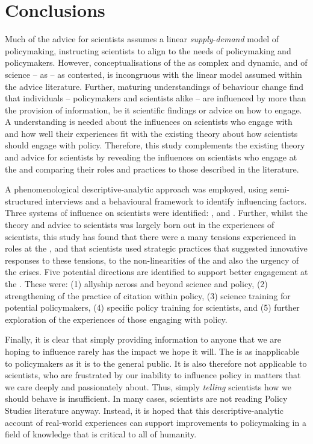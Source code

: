 \chapter{Conclusions}\label{ch:conclusions}

Much of the advice for scientists assumes a linear \emph{supply}-\emph{demand} model of policymaking, instructing scientists to align to the needs of policymaking and policymakers. However, conceptualisations of the \SPI{} as complex and dynamic, and of \CAN{} science -- as \PNS{} -- as contested, is incongruous with the linear model assumed within the advice literature. Further, maturing understandings of behaviour change find that individuals -- policymakers and scientists alike -- are influenced by more than the provision of information, be it scientific findings or advice on how to engage. A understanding is needed about the influences on scientists who engage with \CAN{} \SPI{} and how well their experiences fit with the existing theory about how scientists should engage with policy. Therefore, this study complements the existing theory and advice for scientists by revealing the influences on scientists who engage at the \CAN{} \SPI and comparing their roles and practices to those described in the literature.

A phenomenological descriptive-analytic approach was employed, using semi-structured interviews and a behavioural framework to identify influencing factors. Three systems of influence on scientists were identified: \skiinte, \skiknow{} and \skiscip. Further, whilst the theory and advice to scientists was largely born out in the experiences of scientists, this study has found that there were a many tensions experienced in roles at the \SPI, and that scientists used strategic practices that suggested innovative responses to these tensions, to the non-linearities of the \SPI{} and also the urgency of the \CAN{} crises. Five potential directions are identified to support better engagement at the \CAN{} \SPI. These were: (1) allyship across and beyond \CAN{} science and policy, (2) strengthening of the practice of citation within policy, (3) science training for potential policymakers, (4) specific policy training for scientists, and (5) further exploration of the experiences of those engaging with policy. 

Finally, it is clear that simply providing information to anyone that we are hoping to influence rarely has the impact we hope it will. The \IDM{} is as inapplicable to policymakers as it is to the general public. It is also therefore not applicable to scientists, who are frustrated by our inability to influence policy in matters that we care deeply and passionately about. Thus, simply \emph{telling} scientists how we should behave is insufficient. In many cases, scientists are not reading Policy Studies literature anyway. Instead, it is hoped that this descriptive-analytic account of real-world experiences can support improvements to policymaking in a field of knowledge that is critical to all of humanity. 